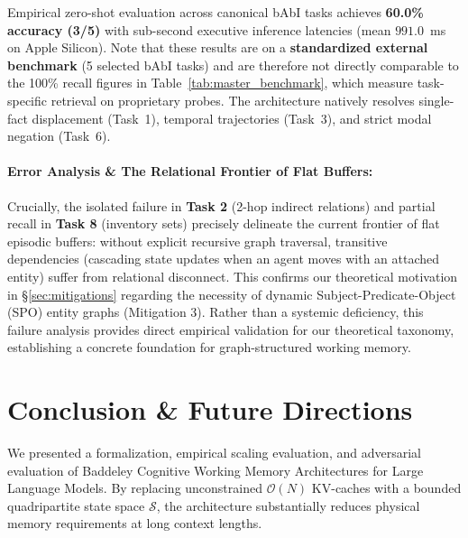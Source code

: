 \documentclass[11pt,a4paper]{article}
\begin{document}
Empirical zero-shot evaluation across canonical bAbI tasks achieves \textbf{60.0\% accuracy (3/5)} with sub-second executive inference latencies (mean $991.0$~ms on Apple Silicon). Note that these results are on a \textbf{standardized external benchmark} (5 selected bAbI tasks) and are therefore not directly comparable to the 100\% recall figures in Table~\ref{tab:master_benchmark}, which measure task-specific retrieval on proprietary probes. The architecture natively resolves single-fact displacement (Task~1), temporal trajectories (Task~3), and strict modal negation (Task~6).

\paragraph{Error Analysis \& The Relational Frontier of Flat Buffers:}
Crucially, the isolated failure in \textbf{Task 2} (2-hop indirect relations) and partial recall in \textbf{Task 8} (inventory sets) precisely delineate the current frontier of flat episodic buffers: without explicit recursive graph traversal, transitive dependencies (cascading state updates when an agent moves with an attached entity) suffer from relational disconnect. This confirms our theoretical motivation in \S\ref{sec:mitigations} regarding the necessity of dynamic Subject-Predicate-Object (SPO) entity graphs (Mitigation 3). Rather than a systemic deficiency, this failure analysis provides direct empirical validation for our theoretical taxonomy, establishing a concrete foundation for graph-structured working memory.


\section{Conclusion \& Future Directions}
We presented a formalization, empirical scaling evaluation, and adversarial evaluation of Baddeley Cognitive Working Memory Architectures for Large Language Models. By replacing unconstrained $\mathcal{O}(N)$ KV-caches with a bounded quadripartite state space $\mathcal{S}$, the architecture substantially reduces physical memory requirements at long context lengths.
\end{document}
